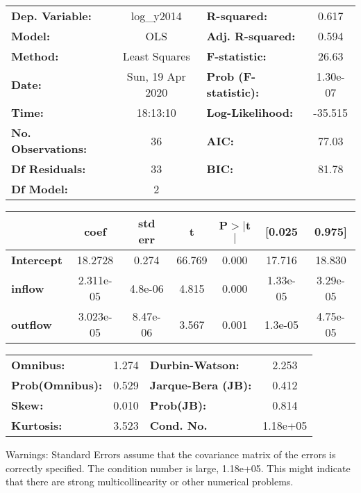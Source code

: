 \begin{center}
\begin{tabular}{lclc}
\toprule
\textbf{Dep. Variable:}    &    log\_y2014    & \textbf{  R-squared:         } &     0.617   \\
\textbf{Model:}            &       OLS        & \textbf{  Adj. R-squared:    } &     0.594   \\
\textbf{Method:}           &  Least Squares   & \textbf{  F-statistic:       } &     26.63   \\
\textbf{Date:}             & Sun, 19 Apr 2020 & \textbf{  Prob (F-statistic):} &  1.30e-07   \\
\textbf{Time:}             &     18:13:10     & \textbf{  Log-Likelihood:    } &   -35.515   \\
\textbf{No. Observations:} &          36      & \textbf{  AIC:               } &     77.03   \\
\textbf{Df Residuals:}     &          33      & \textbf{  BIC:               } &     81.78   \\
\textbf{Df Model:}         &           2      & \textbf{                     } &             \\
\bottomrule
\end{tabular}
\begin{tabular}{lcccccc}
                   & \textbf{coef} & \textbf{std err} & \textbf{t} & \textbf{P$> |$t$|$} & \textbf{[0.025} & \textbf{0.975]}  \\
\midrule
\textbf{Intercept} &      18.2728  &        0.274     &    66.769  &         0.000        &       17.716    &       18.830     \\
\textbf{inflow}    &    2.311e-05  &      4.8e-06     &     4.815  &         0.000        &     1.33e-05    &     3.29e-05     \\
\textbf{outflow}   &    3.023e-05  &     8.47e-06     &     3.567  &         0.001        &      1.3e-05    &     4.75e-05     \\
\bottomrule
\end{tabular}
\begin{tabular}{lclc}
\textbf{Omnibus:}       &  1.274 & \textbf{  Durbin-Watson:     } &    2.253  \\
\textbf{Prob(Omnibus):} &  0.529 & \textbf{  Jarque-Bera (JB):  } &    0.412  \\
\textbf{Skew:}          &  0.010 & \textbf{  Prob(JB):          } &    0.814  \\
\textbf{Kurtosis:}      &  3.523 & \textbf{  Cond. No.          } & 1.18e+05  \\
\bottomrule
\end{tabular}
\end{center}

Warnings: \newline
 [1] Standard Errors assume that the covariance matrix of the errors is correctly specified. \newline
 [2] The condition number is large, 1.18e+05. This might indicate that there are \newline
 strong multicollinearity or other numerical problems.